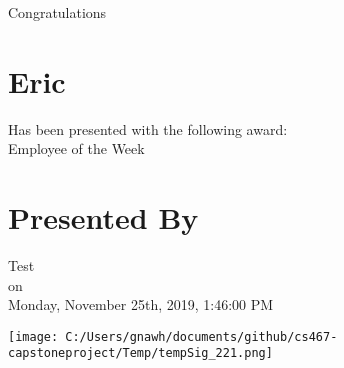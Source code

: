 \documentclass{article}
\begin{document}
        \begin{center}
        \Huge Congratulations
        
        \section*{Eric}
        \normalsize Has been presented with the following award:\\
        \vspace{15mm}
        \LARGE Employee of the Week
        \vspace{5mm}
        
        \section*{Presented By}
        \large Test \\
        on \\
        Monday, November 25th, 2019, 1:46:00 PM
        \end{center}
        
        \begin{flushright}
        \vspace{15mm}
        \texttt{[image: C:/Users/gnawh/documents/github/cs467-capstoneproject/Temp/tempSig\_221.png]}
        \end{flushright}
        
        
        
\end{document}

